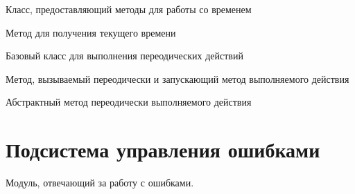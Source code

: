 \documentclass[letterpaper,10pt,english]{sphinxmanual}
\begin{document}
\begin{fulllineitems}
\label{config:mainServer.timeManager.TimeManager}
Класс, предоставляющий методы для работы со временем

\begin{fulllineitems}
\label{config:mainServer.timeManager.TimeManager.getTime}
Метод для получения текущего времени

\end{fulllineitems}


\end{fulllineitems}


\begin{fulllineitems}
\label{config:mainServer.timeManager.Worker}
Базовый класс для выполнения переодических действий

\begin{fulllineitems}
\label{config:mainServer.timeManager.Worker.doWork}
Метод, вызываемый переодически и запускающий метод выполняемого действия

\end{fulllineitems}


\begin{fulllineitems}
\label{config:mainServer.timeManager.Worker.work}
Абстрактный метод переодически выполняемого действия

\end{fulllineitems}


\end{fulllineitems}



\section{Подсистема управления ошибками}
\label{config:id3}\label{config:module-mainServer.errorManager}
Модуль, отвечающий за работу с ошибками.
\end{document}
